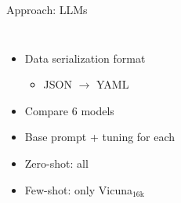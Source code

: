 \documentclass[en,16:9,smallfoot]{sdqbeamer}
\begin{document}
   \begin{frame}{Approach: LLMs}
   \begin{columns}
           \begin{itemize}
               \item Data serialization format
               \begin{itemize}
                    \item JSON $\rightarrow$ YAML
               \end{itemize}
               \item Compare 6 models
               \item Base prompt + tuning for each
               \item Zero-shot: all
               \item Few-shot: only Vicuna${}_\text{16k}$
           \end{itemize}
        \begin{overlayarea}{\textwidth}{2.45cm}
\end{overlayarea}
\end{columns}
\end{frame}
\end{document}
